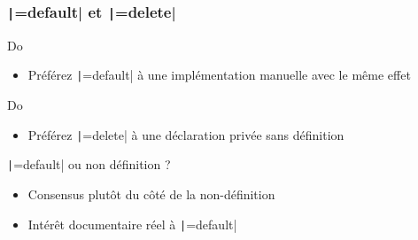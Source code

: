 \documentclass[C++.tex]{subfiles}
\begin{document}
\begin{frame}[fragile]
	\frametitle{\texttt|=default| et \texttt|=delete|}
	\begin{exampleblock}{Do}
		\begin{itemize}
			\item Préférez \texttt|=default| à une implémentation manuelle avec le même effet
		\end{itemize}
	\end{exampleblock}

	\begin{exampleblock}{Do}
		\begin{itemize}
			\item Préférez \texttt|=delete| à une déclaration privée sans définition
		\end{itemize}
	\end{exampleblock}

	\begin{block}{\texttt|=default| ou non définition ?}
		\begin{itemize}
			\item Consensus plutôt du côté de la non-définition
			\item Intérêt documentaire réel à \texttt|=default|
		\end{itemize}
	\end{block}
\end{frame}
\end{document}
